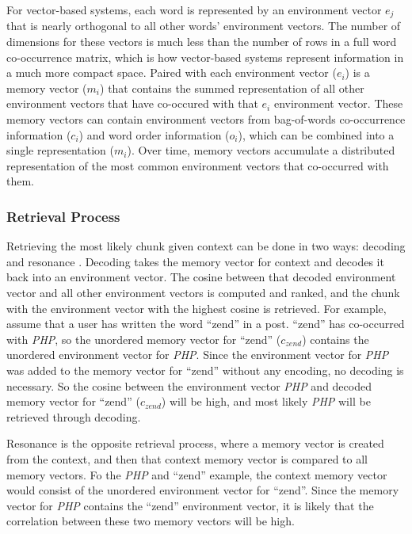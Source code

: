\documentclass[man,floatsintext]{apa6}
\begin{document}
For vector-based systems, each word is represented by an environment vector $e_{j}$ that is nearly orthogonal to all other words' environment vectors.
The number of dimensions for these vectors is much less than the number of rows in a full word co-occurrence matrix, which is how vector-based systems represent information in a much more compact space.
Paired with each environment vector ($e_{i}$) is a memory vector ($m_{i}$) that contains the summed representation of all other environment vectors that have co-occured with that $e_{i}$ environment vector.
These memory vectors can contain environment vectors from bag-of-words co-occurrence information ($c_{i}$) and word order information ($o_{i}$), which can be combined into a single representation ($m_{i}$).
Over time, memory vectors accumulate a distributed representation of the most common environment vectors that co-occurred with them.

\subsubsection{Retrieval Process}

Retrieving the most likely chunk given context can be done in two ways: decoding and resonance \parencite{Jones2007}.
Decoding takes the memory vector for context and decodes it back into an environment vector.
The cosine between that decoded environment vector and all other environment vectors is computed and ranked, and the chunk with the environment vector with the highest cosine is retrieved.
For example, assume that a user has written the word ``zend'' in a post.
``zend'' has co-occurred with \emph{PHP}, so the unordered memory vector for ``zend'' ($c_{zend}$) contains the unordered environment vector for \emph{PHP}.
Since the environment vector for \emph{PHP} was added to the memory vector for ``zend'' without any encoding, no decoding is necessary.
So the cosine between the environment vector \emph{PHP} and decoded memory vector for ``zend'' ($c_{zend}$) will be high, and most likely \emph{PHP} will be retrieved through decoding.

Resonance is the opposite retrieval process, where a memory vector is created from the context, and then that context memory vector is compared to all memory vectors.
Fo the \emph{PHP} and ``zend'' example, the context memory vector would consist of the unordered environment vector for ``zend''.
Since the memory vector for \emph{PHP} contains the ``zend'' environment vector, it is likely that the correlation between these two memory vectors will be high.
\end{document}
